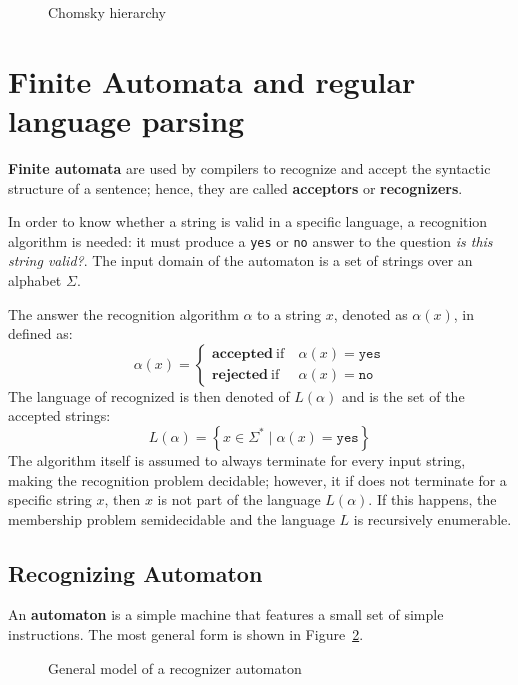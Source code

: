 \documentclass[english]{article}
\begin{document}
\begin{figure}[htbp]
  \bigskip
  \centering
  \caption{Chomsky hierarchy}
  \label{fig:chomsky-hierarchy}
  \bigskip
\end{figure}

\clearpage
\section{Finite Automata and regular language parsing}
\label{sec:finite-automata}

\textbf{Finite automata} are used by compilers to recognize and accept the syntactic structure of a sentence;
hence, they are called \textbf{acceptors} or \textbf{recognizers}.

In order to know whether a string is valid in a specific language, a recognition algorithm is needed: it must produce a \texttt{yes} or \texttt{no} answer to the question \textit{is this string valid?}.
The input domain of the automaton is a set of strings over an alphabet \(\Sigma\).

The answer the recognition algorithm \(\alpha\) to a string \(x\), denoted as \(\alpha(x)\), in defined as:
\[ \alpha(x) = \begin{cases}
    \textbf{accepted} \ \text{if} \  & \alpha(x) = \texttt{yes} \\
    \textbf{rejected} \ \text{if} \  & \alpha(x) = \texttt{no}
  \end{cases}\]
The language of recognized is then denoted of \(L(\alpha)\) and is the set of the accepted strings:
\[ L(\alpha) = \left\{ x \in \Sigma^\ast \mid \alpha(x) = \texttt{yes} \right\}\]
The algorithm itself is assumed to always terminate for every input string, making the recognition problem decidable;
however, it if does not terminate for a specific string \(x\), then \(x\) is not part of the language \(L(\alpha)\).
If this happens, the membership problem semidecidable and the language \(L\) is recursively enumerable.

\subsection{Recognizing Automaton}

An \textbf{automaton} is a simple machine that features a small set of simple instructions.
The most general form is shown in Figure~\ref{fig:automaton}.

\begin{figure}[hbtp]
  \centering
  \bigskip
  \caption{General model of a recognizer automaton}
  \label{fig:automaton}
  \bigskip
\end{figure}
\end{document}

